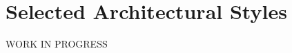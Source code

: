 \documentclass[../../DD.tex]{subfiles}
\begin{document}
\section{Selected Architectural Styles}
	WORK IN PROGRESS
	
\end{document}
